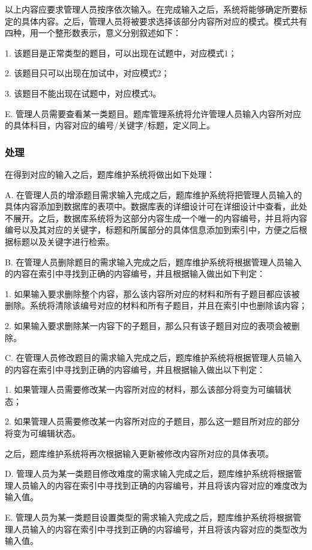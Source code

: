 以上内容应要求管理人员按序依次输入。在完成输入之后，系统将能够确定所要标定的具体内容。之后，管理人员将被要求选择该部分内容所对应的模式。模式共有四种，用一个整形数表示，意义分别叙述如下：

	1. 该题目是正常类型的题目，可以出现在试题中，对应模式1；

	2. 该题目只可以出现在加试中，对应模式2；

	3. 该题目不能出现在试题中，对应模式3。

E. 管理人员需要查看某一类题目。题库管理系统将允许管理人员输入内容所对应的具体科目，内容对应的编号/关键字/标题，定义同上。
	
\subsubsection{处理}
在得到对应的输入之后，题库维护系统将做出如下处理：

A. 在管理人员的增添题目需求输入完成之后，题库维护系统将把管理人员输入的具体内容添加到数据库的表项中。数据库表的详细设计可在详细设计中查看，此处不展开。之后，数据库系统将为这部分内容生成一个唯一的内容编号，并且将内容编号以及其对应的关键字，标题和所属部分的具体信息添加到索引中，方便之后根据标题以及关键字进行检索。

B. 在管理人员删除题目的需求输入完成之后，题库维护系统将根据管理人员输入的内容在索引中寻找到正确的内容编号，并且根据输入做出如下判定：

	1. 如果输入要求删除整个内容，那么该内容所对应的材料和所有子题目都应该被删除。系统将清除该编号对应的材料和所有子题目，并且在索引中也删除该内容；

	2. 如果输入要求删除某一内容下的子题目，那么只有该子题目对应的表项会被删除。

C. 在管理人员修改题目的需求输入完成之后，题库维护系统将根据管理人员输入的内容在索引中寻找到正确的内容编号，并且根据输入做出以下判定：

	1. 如果管理人员需要修改某一内容所对应的材料，那么该部分将变为可编辑状态；

	2. 如果管理人员需要修改某一内容所对应的子题目，那么这一题目所对应的部分将变为可编辑状态。

	之后，题库维护系统将再次根据输入更新被修改内容所对应的具体表项。

D. 管理人员为某一类题目修改难度的需求输入完成之后，题库维护系统将根据管理人员输入的内容在索引中寻找到正确的内容编号，并且将该内容对应的难度改为输入值。

E. 管理人员为某一类题目设置类型的需求输入完成之后，题库维护系统将根据管理人员输入的内容在索引中寻找到正确的内容编号，并且将该内容对应的类型改为输入值。

